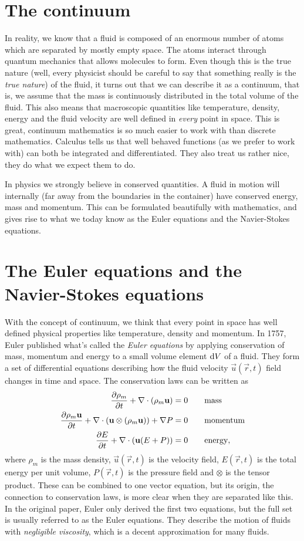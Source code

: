 \section{The continuum}
\label{sec:continuum}
In reality, we know that a fluid is composed of an enormous number of atoms which are separated by mostly empty space. The atoms interact through quantum mechanics that allows molecules to form. Even though this is the true nature (well, every physicist should be careful to say that something really is the \textit{true nature}) of the fluid, it turns out that we can describe it as a continuum, that is, we assume that the mass is continuously distributed in the total volume of the fluid. This also means that macroscopic quantities like temperature, density, energy and the fluid velocity are well defined in \textit{every} point in space. This is great, continuum mathematics is so much easier to work with than discrete mathematics. Calculus tells us that well behaved functions (as we prefer to work with) can both be integrated and differentiated. They also treat us rather nice, they do what we expect them to do.

In physics we strongly believe in conserved quantities. A fluid in motion will internally (far away from the boundaries in the container) have conserved energy, mass and momentum. This can be formulated beautifully with mathematics, and gives rise to what we today know as the Euler equations and the Navier-Stokes equations.
\section{The Euler equations and the Navier-Stokes equations}
\label{sec:theory_of_fluids_euler_navier}
With the concept of continuum, we think that every point in space has well defined physical properties like temperature, density and momentum. In 1757, Euler published what's called the \textit{Euler equations} by applying conservation of mass, momentum and energy to a small volume element $\mathrm{d}V$ of a fluid. They form a set of differential equations describing how the fluid velocity $\vec u(\vec r, t)$ field changes in time and space. The conservation laws can be written as
\begin{align}
	\frac{\partial \rho_m}{\partial t} + \nabla\cdot (\rho_m\mathbf u) &= 0 \qquad \text{mass}\\
	\frac{\partial \rho_m \mathbf u}{\partial t} + \nabla \cdot (\mathbf u \otimes (\rho_m\mathbf u)) + \nabla P &= 0\qquad \text{momentum}\\
	\frac{\partial E}{\partial t} + \nabla\cdot (\mathbf u(E + P)) &= 0\qquad \text{energy},
\end{align}
where $\rho_m$ is the mass density, $\vec u(\vec r, t)$ is the velocity field, $E(\vec r, t)$ is the total energy per unit volume, $P(\vec r, t)$ is the pressure field and $\otimes$ is the tensor product. These can be combined to one vector equation, but its origin, the connection to conservation laws, is more clear when they are separated like this. In the original paper, Euler only derived the first two equations, but the full set is usually referred to as the Euler equations. They describe the motion of fluids with \textit{negligible viscosity}, which is a decent approximation for many fluids.

